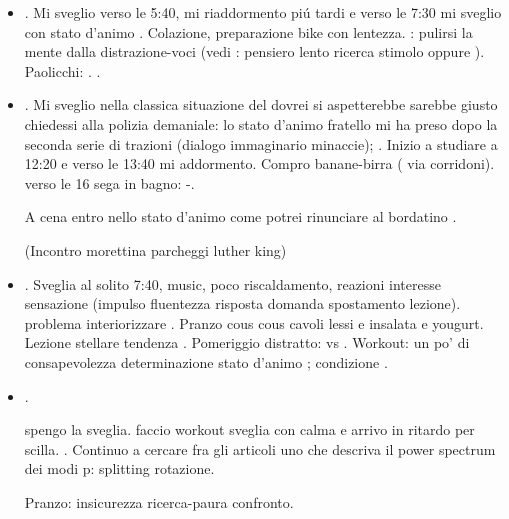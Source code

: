 \begin{itemize}
\item {}. Mi sveglio verso le 5:40, mi riaddormento pi\'u tardi e verso le 7:30 mi sveglio con stato d'animo . Colazione, preparazione bike con lentezza. : pulirsi la mente dalla distrazione-voci (vedi : pensiero lento ricerca stimolo oppure  ). Paolicchi:  . .

\item {}. Mi sveglio nella classica situazione del dovrei si aspetterebbe sarebbe giusto chiedessi alla polizia demaniale: lo stato d'animo fratello mi ha preso dopo la seconda serie di trazioni (dialogo immaginario minaccie); . Inizio a studiare a 12:20 e verso le 13:40 mi addormento. Compro banane-birra ( via corridoni). verso le 16 sega in bagno: -.

A cena entro nello stato d'animo  come potrei rinunciare al bordatino .

(Incontro morettina parcheggi luther king)

\item {}. Sveglia al solito 7:40, music, poco riscaldamento, reazioni interesse sensazione  (impulso fluentezza risposta domanda spostamento lezione). problema interiorizzare . Pranzo cous cous cavoli lessi e insalata e yougurt. Lezione stellare tendenza . Pomeriggio distratto:  vs . Workout: un po' di consapevolezza determinazione stato d'animo ; condizione .

\item {}.

spengo la sveglia. faccio workout sveglia con calma e arrivo in ritardo per scilla. . Continuo a cercare fra gli articoli uno che descriva il power spectrum dei modi p: splitting rotazione.

Pranzo: insicurezza ricerca-paura confronto.


\end{itemize}
